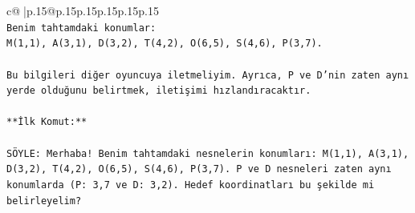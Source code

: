\documentclass{article}
\begin{document}
{\begin{supertabular}{c@{$\;$}|p{.15\linewidth}@{}p{.15\linewidth}p{.15\linewidth}p{.15\linewidth}p{.15\linewidth}p{.15\linewidth}}
{{{\\ 
\texttt{Benim tahtamdaki konumlar:} \\
\texttt{M(1,1), A(3,1), D(3,2), T(4,2), O(6,5), S(4,6), P(3,7).} \\
\\ 
\texttt{Bu bilgileri diğer oyuncuya iletmeliyim. Ayrıca, P ve D'nin zaten aynı yerde olduğunu belirtmek, iletişimi hızlandıracaktır.} \\
\\ 
\texttt{**İlk Komut:**} \\
\\ 
\texttt{SÖYLE: Merhaba! Benim tahtamdaki nesnelerin konumları: M(1,1), A(3,1), D(3,2), T(4,2), O(6,5), S(4,6), P(3,7). P ve D nesneleri zaten aynı konumlarda (P: 3,7 ve D: 3,2). Hedef koordinatları bu şekilde mi belirleyelim?} \\
            }
        }
    }
     \\ \\


\end{supertabular}}
\end{document}
